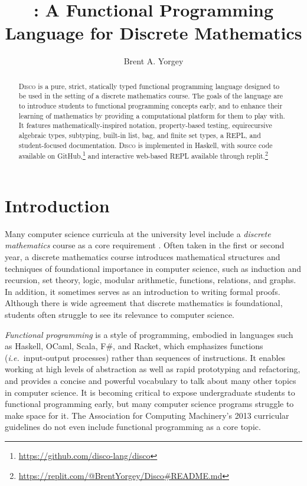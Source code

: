 \documentclass[submission,copyright,creativecommons]{eptcs}
\title{\disco: A Functional Programming Language for Discrete Mathematics}
\author{Brent A. Yorgey
\institute{Hendrix College\\ Conway, Arkansas, USA}
\email{yorgey@hendrix.edu}
}
\newcommand{\disco}{\textsc{Disco}\xspace}
\newcommand{\ie}{\emph{i.e.}\ }
\newcommand{\todo}[1]{\textcolor{red}{[TODO: #1]}}
\newcommand{\todo}[1]{}
\begin{document}
\maketitle


\begin{abstract}
  \disco is a pure, strict, statically typed functional programming
  language designed to be used in the setting of a discrete
  mathematics course. The goals of the language are to introduce
  students to functional programming concepts early, and to enhance
  their learning of mathematics by providing a computational platform
  for them to play with.  It features mathematically-inspired notation,
  property-based testing, equirecursive algebraic types, subtyping,
  built-in list, bag, and finite set types, a REPL, and student-focused
  documentation.  \disco is implemented in Haskell, with source code
  available on
  GitHub,\footnote{\url{https://github.com/disco-lang/disco}} and
  interactive web-based REPL available through
  replit.\footnote{\url{https://replit.com/@BrentYorgey/Disco\#README.md}}
\end{abstract}

\section{Introduction}
\label{sec:introduction}

Many computer science curricula at the university level include a
\emph{discrete mathematics} course as a core requirement
\cite{ACM:2013}.  Often taken in the first or second year, a discrete
mathematics course introduces mathematical structures and techniques
of foundational importance in computer science, such as induction and
recursion, set theory, logic, modular arithmetic, functions,
relations, and graphs.  In addition, it sometimes serves as an
introduction to writing formal proofs.  Although there is wide
agreement that discrete mathematics is foundational, students often
struggle to see its relevance to computer science.

\emph{Functional programming} is a style of programming, embodied in
languages such as Haskell, OCaml, Scala, F\#, and Racket, which
emphasizes functions (\ie input-output processes) rather than
sequences of instructions. It enables working at high levels of
abstraction as well as rapid prototyping and refactoring, and provides
a concise and powerful vocabulary to talk about many other topics in
computer science.  It is becoming critical to expose undergraduate
students to functional programming early, but many computer science
programs struggle to make space for it.  The Association for Computing
Machinery's 2013 curricular guidelines \cite{ACM:2013} do not even
include functional programming as a core topic.
\end{document}
